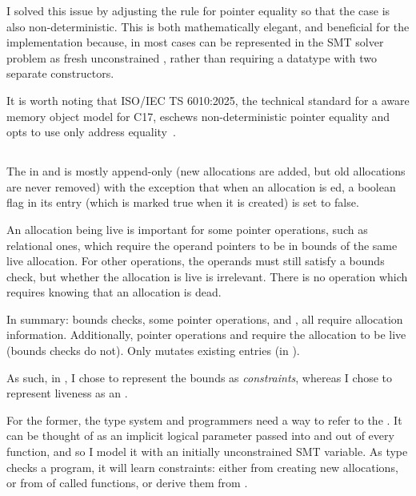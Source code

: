 I solved this issue by adjusting the rule for pointer equality so that the
 case is also non-deterministic.
This is both mathematically elegant, and beneficial for the 
implementation because, in most cases   can be
represented in the SMT solver problem as fresh unconstrained ,
rather than requiring a datatype with two separate constructors.

It is worth noting that ISO/IEC TS 6010:2025, the technical standard for a
 aware memory object model for C17, eschews
non-deterministic pointer equality and opts to use only address
equality~.

\subsection{}\label{subsec:alloc-history}

The  in  and  is mostly append-only
(new allocations are added, but old allocations are never removed) with the
exception that when an allocation is ed, a boolean flag
in its entry (which is marked true when it is created) is set to false.

An allocation being live is important for some pointer operations, such as
relational ones, which require the operand pointers to be in bounds of the same
live allocation. For other operations, the operands must still satisfy a bounds
check, but whether the allocation is live is irrelevant. There is no operation
which requires knowing that an allocation is dead.

In summary: bounds checks, some pointer operations, and ,
all require allocation information. Additionally, pointer operations and
 require the allocation to be live (bounds checks do
not). Only  mutates existing 
entries (in ).

As such, in , I chose to represent the bounds as \emph{constraints},
whereas I chose to represent liveness as an \emph{}
.

For the former, the type system and programmers need a way to refer to the
. It can be thought of as an implicit logical parameter
passed into and out of every function, and so I model it with an initially
unconstrained SMT variable. As  type checks a  program, it
will learn constraints: either from creating new allocations, or from
 of called functions, or derive them from  .

